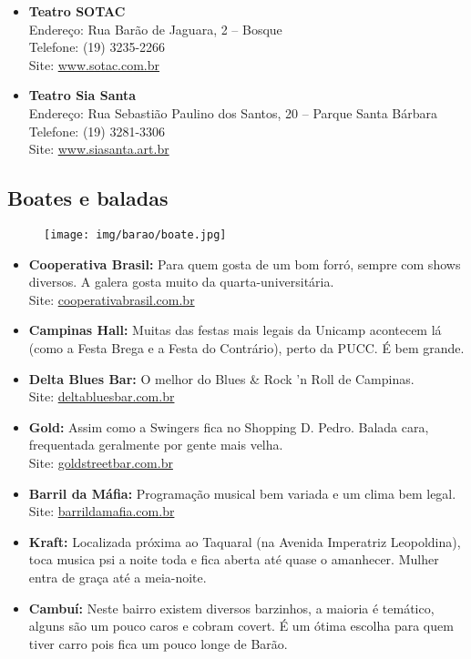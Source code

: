 \begin{itemize}
    \item   \textbf{Teatro SOTAC}
		\\Endereço: Rua Barão de Jaguara, 2 -- Bosque
		\\Telefone: (19) 3235-2266
		\\Site: \url{www.sotac.com.br}

    \item   \textbf{Teatro Sia Santa}
		\\Endereço: Rua Sebastião Paulino dos Santos, 20 -- Parque Santa Bárbara
		\\Telefone: (19) 3281-3306
		\\Site: \url{www.siasanta.art.br}
\end{itemize}

\subsection{Boates e baladas}

\begin{figure}[h!]
    \centering
    \texttt{[image: img/barao/boate.jpg]}
\end{figure}

\begin{itemize}
    \item   \textbf{Cooperativa Brasil:} Para quem gosta de um bom forró, sempre
        com shows diversos. A galera gosta muito da quarta-universitária.
        \\Site: \url{cooperativabrasil.com.br}

    \item   \textbf{Campinas Hall:} Muitas das festas mais legais da Unicamp
        acontecem lá (como a Festa Brega e a Festa do Contrário), perto da PUCC.
        É bem grande.

    \item   \textbf{Delta Blues Bar:} O melhor do Blues \& Rock 'n Roll de
        Campinas.
        \\Site: \url{deltabluesbar.com.br}

    \item   \textbf{Gold:} Assim como a Swingers fica no Shopping D. Pedro.
        Balada cara, frequentada geralmente por gente mais velha.
        \\Site: \url{goldstreetbar.com.br}

    \item   \textbf{Barril da Máfia:} Programação musical bem variada e um clima
        bem legal.
        \\Site: \url{barrildamafia.com.br}

    \item   \textbf{Kraft:} Localizada próxima ao Taquaral (na Avenida
        Imperatriz Leopoldina), toca musica psi a noite toda e fica aberta até
        quase o amanhecer. Mulher entra de graça até a meia-noite.

    \item   \textbf{Cambuí:} Neste bairro existem diversos barzinhos, a maioria
        é temático, alguns são um pouco caros e cobram covert. É um ótima
        escolha para quem tiver carro pois fica um pouco longe de Barão.
\end{itemize}

